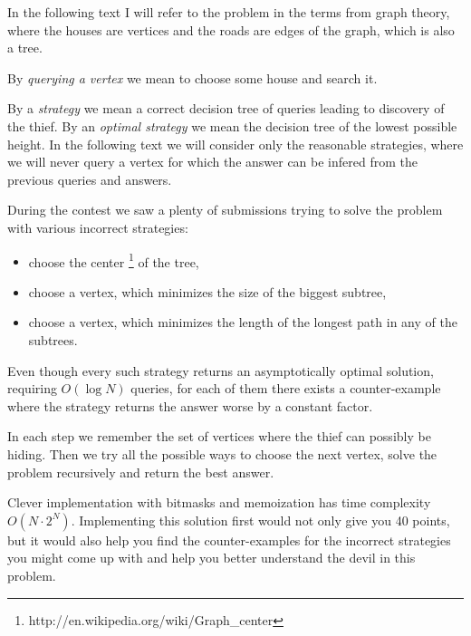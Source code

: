 


In the following text I will refer to the problem in the terms from graph theory,
where the houses are vertices and the roads are edges of the graph, which is also a
tree.

By \emph{querying a vertex} we mean to choose some house and search it.

By a \emph{strategy} we mean a correct decision tree of queries leading to discovery of the thief.
By an \emph{optimal strategy} we mean the decision tree of the lowest possible height.
In the following text we will consider only the reasonable strategies, where
we will never query a vertex for which the answer can be infered from the previous queries and answers.



During the contest we saw a plenty of submissions trying to solve the problem
with various incorrect strategies:
\begin{itemize}
\item choose the center \footnote{http://en.wikipedia.org/wiki/Graph\_center} of the tree,
\item choose a vertex, which minimizes the size of the biggest subtree,
\item choose a vertex, which minimizes the length of the longest path in any of the subtrees.
\end{itemize}

Even though every such strategy returns an asymptotically optimal solution,
requiring $O(\log N)$ queries, for each of them there exists a counter-example
where the strategy returns the answer worse by a constant factor.



In each step we remember the set of vertices where the thief can possibly be hiding.
Then we try all the possible ways to choose the next vertex, solve the problem
recursively and return the best answer.

Clever implementation with bitmasks and memoization has time complexity $O(N\cdot2^N)$.
Implementing this solution first would not only give you 40 points, but it would also
help you find the counter-examples for the incorrect strategies you might come
up with and help you better understand the devil in this problem.


